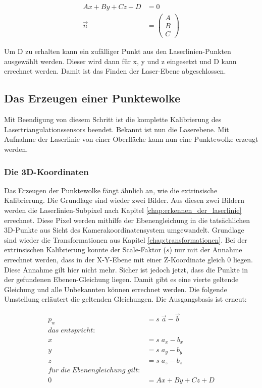 		\begin{equation}
			\begin{aligned}
				Ax + By +Cz +D &= 0 \\
				\vec{n} &= \begin{pmatrix}
				A \\
				B \\
				C
				\end{pmatrix}
			\end{aligned}
		\end{equation}
		
		Um D zu erhalten kann ein zufälliger Punkt aus den Laserlinien-Punkten ausgewählt werden. Dieser wird dann für x, y und z eingesetzt und D kann errechnet werden. Damit ist das Finden der Laser-Ebene abgeschlossen. 
		\label{chap:kalibrierung_extrinsisch}
		
	\subsection{Das Erzeugen einer Punktewolke}
	Mit Beendigung von diesem Schritt ist die komplette Kalibrierung des Lasertriangulationssensors beendet. Bekannt ist nun die Laserebene. Mit Aufnahme der Laserlinie von einer Oberfläche kann nun eine Punktewolke erzeugt werden.
		\subsubsection{Die 3D-Koordinaten}
	Das Erzeugen der Punktewolke fängt ähnlich an, wie die extrinsische Kalibrierung. Die Grundlage sind wieder zwei Bilder. Aus diesen zwei Bildern werden die Laserlinien-Subpixel nach Kapitel \ref{chap:erkennen_der_laserlinie} errechnet. Diese Pixel werden mithilfe der Ebenengleichung in die tatsächlichen 3D-Punkte aus Sicht des Kamerakoordinatensystem umgewandelt. Grundlage sind wieder die Transformationen aus Kapitel \ref{chap:transformationen}. Bei der extrinsischen Kalibrierung konnte der Scale-Faktor (\( s \)) nur mit der Annahme errechnet werden, dass in der X-Y-Ebene mit einer Z-Koordinate gleich 0 liegen. Diese Annahme gilt hier nicht mehr. Sicher ist jedoch jetzt, dass die Punkte in der gefundenen Ebenen-Gleichung liegen. Damit gibt es eine vierte geltende Gleichung und alle Unbekannten können errechnet werden. Die folgende Umstellung erläutert die geltenden Gleichungen. Die Ausgangsbasis ist erneut:
	
	\begin{equation}
		\begin{aligned}
			p_w &= s \; \vec{a} - \vec{b} \\
			das \; entspricht: \\
			x &= s \; a_x - b_x \\
			y &= s \; a_y - b_y \\
			z &= s \; a_z - b_z \\
			f\ddot{u}r \; die \; Ebenengleichung \; gilt: \\
			0 &= Ax + By + Cz + D \\
		\end{aligned}
	\end{equation}
	
